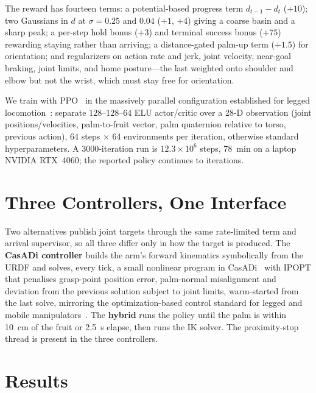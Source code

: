 \documentclass[conference,a4paper]{IEEEtran}
\begin{document}
The reward has fourteen terms: a potential-based progress term $d_{t-1}-d_t$
($+10$); two Gaussians in $d$ at $\sigma=0.25$ and $0.04$ ($+1$, $+4$) giving a
coarse basin and a sharp peak; a per-step hold bonus ($+3$) and terminal
success bonus ($+75$) rewarding staying rather than arriving; a distance-gated
palm-up term ($+1.5$) for orientation; and regularizers on action rate and
jerk, joint velocity, near-goal braking, joint limits, and home posture---the
last weighted onto shoulder and elbow but not the wrist, which must stay free
for orientation.

We train with PPO~\cite{schulman2017ppo} in the massively parallel
configuration established for legged locomotion~\cite{rudin2022walk}: separate
$128$--$128$--$64$ ELU actor/critic over a 28-D observation (joint
positions/velocities, palm-to-fruit vector, palm quaternion relative to torso,
previous action), $64$ steps $\times$ $64$ environments per iteration,
otherwise standard hyperparameters. A $3000$-iteration run is $12.3\times10^6$
steps, \SI{78}{\minute} on a laptop NVIDIA RTX~4060; the reported policy continues to
\RESckpt{} iterations.

\section{Three Controllers, One Interface}
\label{sec:controllers}

Two alternatives publish joint targets through the same rate-limited term and
arrival supervisor, so all three differ only in how the target is produced.
The \textbf{CasADi controller} builds the arm's forward kinematics
symbolically from the URDF and solves, every tick, a small nonlinear program
in CasADi~\cite{andersson2019casadi} with IPOPT that penalises grasp-point
position error, palm-normal misalignment and deviation from the previous
solution subject to joint limits, warm-started from the last solve, mirroring
the optimization-based control standard for legged and mobile
manipulators~\cite{molnar2026wbid,rahman2026locoreview}. The \textbf{hybrid}
runs the policy until the palm is within \SI{10}{\centi\metre} of the fruit or
\SI{2.5}{\second} elapse, then runs the IK solver. The proximity-stop thread is present in the three controllers.

\section{Results}
\label{sec:results}
\end{document}
